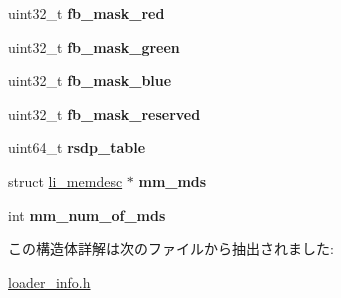 \begin{DoxyCompactItemize}
uint32\+\_\+t {\bfseries fb\+\_\+mask\+\_\+red}
\item 
\hypertarget{structloader__info_a55cb08c4f4345132e3b672fb04903dfe}{}\label{structloader__info_a55cb08c4f4345132e3b672fb04903dfe} 
uint32\+\_\+t {\bfseries fb\+\_\+mask\+\_\+green}
\item 
\hypertarget{structloader__info_a1142333f373fbb4bed8cc53f2c9ca5b2}{}\label{structloader__info_a1142333f373fbb4bed8cc53f2c9ca5b2} 
uint32\+\_\+t {\bfseries fb\+\_\+mask\+\_\+blue}
\item 
\hypertarget{structloader__info_a221a89a8e09e2cf51d5cc94f2a95689e}{}\label{structloader__info_a221a89a8e09e2cf51d5cc94f2a95689e} 
uint32\+\_\+t {\bfseries fb\+\_\+mask\+\_\+reserved}
\item 
\hypertarget{structloader__info_ac103240162f809d47cf2e0095c9db5f2}{}\label{structloader__info_ac103240162f809d47cf2e0095c9db5f2} 
uint64\+\_\+t {\bfseries rsdp\+\_\+table}
\item 
\hypertarget{structloader__info_a067e1f0fe32d1ed59fb328c9b5140783}{}\label{structloader__info_a067e1f0fe32d1ed59fb328c9b5140783} 
struct \hyperlink{structli__memdesc}{li\+\_\+memdesc} $\ast$ {\bfseries mm\+\_\+mds}
\item 
\hypertarget{structloader__info_a3444fcb3cbd4c868754f349b7dfcc5d7}{}\label{structloader__info_a3444fcb3cbd4c868754f349b7dfcc5d7} 
int {\bfseries mm\+\_\+num\+\_\+of\+\_\+mds}
\end{DoxyCompactItemize}


この構造体詳解は次のファイルから抽出されました\+:\begin{DoxyCompactItemize}
\item 
\hyperlink{loader__info_8h}{loader\+\_\+info.\+h}\end{DoxyCompactItemize}
